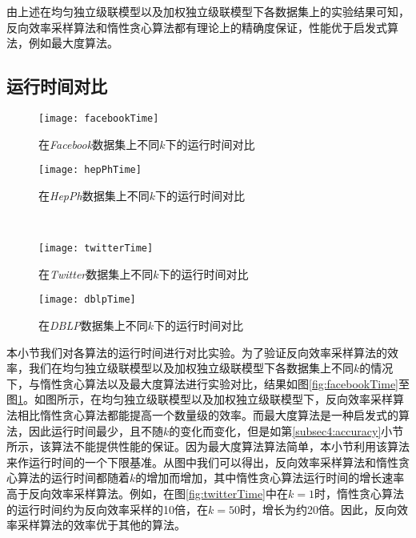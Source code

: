 由上述在均匀独立级联模型以及加权独立级联模型下各数据集上的实验结果可知，反向效率采样算法和惰性贪心算法都有理论上的精确度保证，性能优于启发式算法，例如最大度算法。

\subsection{运行时间对比}
\label{subsec4:runningTime}
\begin{figure}[!ht]
   \begin{minipage}{0.48\textwidth}
     \centering
     \texttt{[image: facebookTime]}
     \caption{在\textit{Facebook}数据集上不同$k$下的运行时间对比}
     \label{fig:facebookTime}
   \end{minipage}
   \hfill
   \begin {minipage}{0.48\textwidth}
     \centering
     \texttt{[image: hepPhTime]}
     \caption{在\textit{HepPh}数据集上不同$k$下的运行时间对比}
     \label{fig:hepPhTime}
   \end{minipage}
   \\
   \begin{minipage}{0.48\textwidth}
     \centering
     \texttt{[image: twitterTime]}
     \caption{在\textit{Twitter}数据集上不同$k$下的运行时间对比}
     \label{fig:twitterTime}
   \end{minipage}
   \hfill
   \begin {minipage}{0.48\textwidth}
     \centering
     \texttt{[image: dblpTime]}
     \caption{在\textit{DBLP}数据集上不同$k$下的运行时间对比}
     \label{fig:dblpTime}
   \end{minipage}
\end{figure}

本小节我们对各算法的运行时间进行对比实验。为了验证反向效率采样算法的效率，我们在均匀独立级联模型以及加权独立级联模型下各数据集上不同$k$的情况下，与惰性贪心算法以及最大度算法进行实验对比，结果如图\ref{fig:facebookTime}至图\ref{fig:dblpTime}。如图所示，在均匀独立级联模型以及加权独立级联模型下，反向效率采样算法相比惰性贪心算法都能提高一个数量级的效率。而最大度算法是一种启发式的算法，因此运行时间最少，且不随$k$的变化而变化，但是如第\ref{subsec4:accuracy}小节所示，该算法不能提供性能的保证。因为最大度算法算法简单，本小节利用该算法来作运行时间的一个下限基准。从图中我们可以得出，反向效率采样算法和惰性贪心算法的运行时间都随着$k$的增加而增加，其中惰性贪心算法运行时间的增长速率高于反向效率采样算法。例如，在图\ref{fig:twitterTime}中在$k=1$时，惰性贪心算法的运行时间约为反向效率采样的10倍，在$k=50$时，增长为约20倍。因此，反向效率采样算法的效率优于其他的算法。

